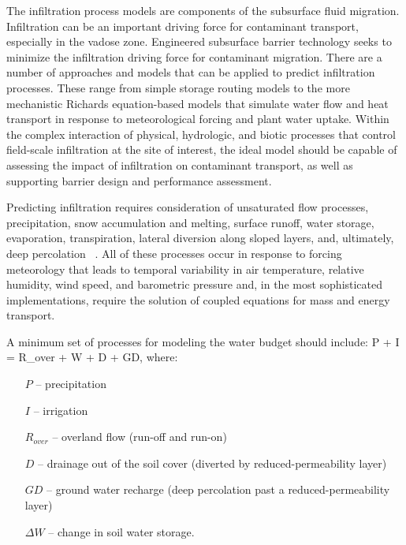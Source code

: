 %
The infiltration process models are components of the subsurface fluid migration. 
Infiltration can be an important driving force for contaminant transport, especially in the vadose zone.  
Engineered subsurface barrier technology seeks to minimize the infiltration
driving force for contaminant migration.  
There are a number of approaches and models that can be applied to predict infiltration processes. 
These range from simple storage routing models to the more mechanistic 
Richards equation-based 
models that simulate water flow and heat transport 
in response to meteorological forcing and plant water uptake. 
Within the complex interaction of physical, hydrologic, and biotic processes 
that control field-scale infiltration at the site of interest, 
the ideal model should be capable of assessing the impact
of infiltration on contaminant transport, 
as well as supporting barrier design and performance assessment.

Predicting infiltration requires consideration of unsaturated flow processes, 
precipitation, snow accumulation and melting, surface runoff, water storage, evaporation, transpiration, 
lateral diversion along sloped layers, and, ultimately, deep percolation ~\citep{ward_1997,ward_2005}. 
All of these processes occur in response to forcing meteorology 
that leads to temporal variability in air temperature, relative humidity, wind speed, and barometric
pressure and, in the most sophisticated implementations, 
require the solution of coupled equations for mass and energy transport.

A minimum set of processes for modeling the water budget should include:  
\EQ
P + I = R_{over} + \Delta W + D + GD,%
\EN
where:
\begin{itemize}
\item[$P$] -- precipitation 
\item[$I$] -- irrigation
\item[$R_{over}$] -- overland flow (run-off and run-on)
\item[$D$] -- drainage out of the soil cover (diverted by reduced-permeability layer)
\item[$GD$] -- ground water recharge (deep percolation past a reduced-permeability layer)
\item[$\Delta W$] -- change in soil water storage.
\end{itemize}


